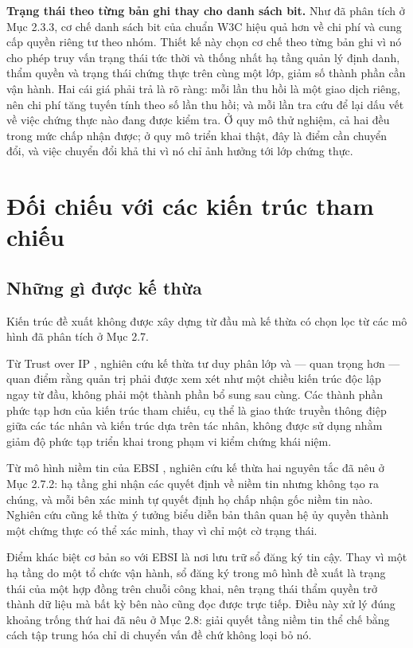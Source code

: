 \noindent \textbf{Trạng thái theo từng bản ghi thay cho danh sách bit.} Như đã phân tích ở Mục 2.3.3, cơ chế danh sách bit của chuẩn W3C hiệu quả hơn về chi phí và cung cấp quyền riêng tư theo nhóm. Thiết kế này chọn cơ chế theo từng bản ghi vì nó cho phép truy vấn trạng thái tức thời và thống nhất hạ tầng quản lý định danh, thẩm quyền và trạng thái chứng thực trên cùng một lớp, giảm số thành phần cần vận hành. Hai cái giá phải trả là rõ ràng: mỗi lần thu hồi là một giao dịch riêng, nên chi phí tăng tuyến tính theo số lần thu hồi; và mỗi lần tra cứu để lại dấu vết về việc chứng thực nào đang được kiểm tra. Ở quy mô thử nghiệm, cả hai đều trong mức chấp nhận được; ở quy mô triển khai thật, đây là điểm cần chuyển đổi, và việc chuyển đổi khả thi vì nó chỉ ảnh hưởng tới lớp chứng thực.

\section{Đối chiếu với các kiến trúc tham chiếu}

\subsection{Những gì được kế thừa}

Kiến trúc đề xuất không được xây dựng từ đầu mà kế thừa có chọn lọc từ các mô hình đã phân tích ở Mục 2.7.

Từ Trust over IP \cite{ToIP_Stack2022}, nghiên cứu kế thừa tư duy phân lớp và --- quan trọng hơn --- quan điểm rằng quản trị phải được xem xét như một chiều kiến trúc độc lập ngay từ đầu, không phải một thành phần bổ sung sau cùng. Các thành phần phức tạp hơn của kiến trúc tham chiếu, cụ thể là giao thức truyền thông điệp giữa các tác nhân \cite{DIDComm2021} và kiến trúc dựa trên tác nhân, không được sử dụng nhằm giảm độ phức tạp triển khai trong phạm vi kiểm chứng khái niệm.

Từ mô hình niềm tin của EBSI \cite{EBSI_TrustModel}, nghiên cứu kế thừa hai nguyên tắc đã nêu ở Mục 2.7.2: hạ tầng ghi nhận các quyết định về niềm tin nhưng không tạo ra chúng, và mỗi bên xác minh tự quyết định họ chấp nhận gốc niềm tin nào. Nghiên cứu cũng kế thừa ý tưởng biểu diễn bản thân quan hệ ủy quyền thành một chứng thực có thể xác minh, thay vì chỉ một cờ trạng thái.

Điểm khác biệt cơ bản so với EBSI là nơi lưu trữ sổ đăng ký tin cậy. Thay vì một hạ tầng do một tổ chức vận hành, sổ đăng ký trong mô hình đề xuất là trạng thái của một hợp đồng trên chuỗi công khai, nên trạng thái thẩm quyền trở thành dữ liệu mà bất kỳ bên nào cũng đọc được trực tiếp. Điều này xử lý đúng khoảng trống thứ hai đã nêu ở Mục 2.8: giải quyết tầng niềm tin thể chế bằng cách tập trung hóa chỉ di chuyển vấn đề chứ không loại bỏ nó.

